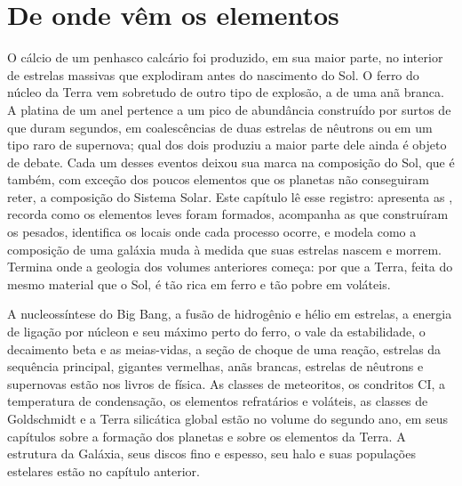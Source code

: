 \chapter{De onde vêm os elementos}\label{ch:b3:origin-of-elements}

O cálcio de um penhasco calcário foi produzido, em sua maior parte, no interior
de estrelas massivas que explodiram antes do nascimento do Sol. O ferro do
núcleo da Terra vem sobretudo de outro tipo de explosão, a de uma
anã branca. A platina de um anel pertence a um pico de abundância construído
por surtos de  que duram segundos, em coalescências de duas estrelas de
nêutrons ou em um tipo raro de supernova; qual dos dois produziu a maior parte
dele ainda é objeto de debate.
Cada um desses eventos deixou sua marca na composição do Sol,
que é também, com exceção dos poucos elementos que os planetas não
conseguiram reter, a composição do Sistema Solar. Este capítulo lê esse
registro: apresenta as , recorda como os elementos leves
foram formados, acompanha as  que construíram os pesados, identifica
os locais onde cada processo ocorre, e modela como a composição de uma
galáxia muda à medida que suas estrelas nascem e morrem. Termina onde a geologia dos
volumes anteriores começa: por que a Terra, feita do mesmo material que
o Sol, é tão rica em ferro e tão pobre em voláteis.

\begin{recall}
A nucleossíntese do Big Bang, a fusão de hidrogênio e hélio em estrelas,
a energia de ligação por núcleon e seu máximo perto do ferro, o vale da
estabilidade, o decaimento beta e as meias-vidas, a seção de choque de uma reação,
estrelas da sequência principal, gigantes vermelhas, anãs brancas, estrelas de nêutrons e
supernovas estão nos livros de física. As classes de meteoritos, os condritos CI,
a temperatura de condensação, os elementos refratários e voláteis, as classes de Goldschmidt
e a Terra silicática global estão no
volume do segundo ano, em seus capítulos sobre a formação dos planetas e sobre
os elementos da Terra. A estrutura da Galáxia, seus discos fino e
espesso, seu halo e suas populações estelares estão no capítulo
anterior.
\end{recall}

